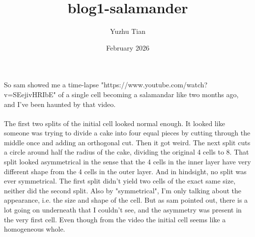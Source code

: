 \documentclass{article}
\title{blog1-salamander}
\author{Yuzhu Tian}
\date{February 2026}
\begin{document}
\maketitle

So sam showed me a time-lapse "https://www.youtube.com/watch?v=SEejivHRIbE" of a single cell becoming a salamandar like two months ago, and I've been haunted by that video.
\paragraph{}
The first two splits of the initial cell looked normal enough. It looked like someone was trying to divide a cake into four equal pieces by cutting through the middle once and adding an orthogonal cut. Then it got weird. The next split cuts a circle around half the radius of the cake, dividing the original 4 cells to 8. That split looked asymmetrical in the sense that the 4 cells in the inner layer have very different shape from the 4 cells in the outer layer. And in hindsight, no split was ever symmetrical. The first split didn't yield two cells of the exact same size, neither did the second split. Also by "symmetrical", I'm only talking about the appearance, i.e. the size and shape of the cell. But as sam pointed out, there is a lot going on underneath that I couldn't see, and the asymmetry was present in the very first cell. Even though from the video the initial cell seems like a homogeneous whole.
\end{document}
